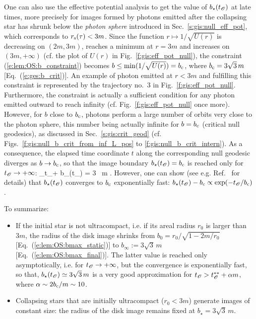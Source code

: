 One can also use the effective potential analysis to get the value of $b_\star(t_{\mathscr{O}})$
at late times, more precisely for images formed by photons emitted after the collapsing star has
shrunk below the \emph{photon sphere}
introduced in Sec.~\ref{s:gis:null_eff_pot}, which corresponds to
$r_{\rm s}(\tau) < 3m$. Since the function $r\mapsto 1/\sqrt{U(r)}$ is
decreasing on $(2m, 3m)$, reaches a minimum at $r=3m$ and increases on $(3m, +\infty)$
(cf. the plot of $U(r)$ in Fig.~\ref{f:gis:eff_pot_null}), the constraint
(\ref{e:lem:OS:b_constraint}) becomes $b \leq \min ({1}/{\sqrt{U(r)}}) = b_{\rm c}$,
where $b_{\rm c} = 3\sqrt{3} \, m$ [Eq.~(\ref{e:ges:b_crit})].
An example of photon emitted at $r<3m$ and fulfilling this constraint is
represented by the trajectory no.~3 in Fig.~\ref{f:gis:eff_pot_null}.
Furthermore, the constraint is actually a sufficient condition for any
photon emitted outward to reach infinity (cf. Fig.~\ref{f:gis:eff_pot_null} once more).
However, for $b$ close to $b_{\rm c}$, photons perform a large number of orbits
very close to the photon sphere, this number being actually infinite for $b=b_{\rm c}$
(critical null geodesics), as discussed in
Sec.~\ref{s:gis:crit_geod}
(cf. Figs.~\ref{f:gis:null_b_crit_from_inf_L_pos} to \ref{f:gis:null_b_crit_intern}).
As a consequence, the elapsed time coordinate $t$ along the corresponding null
geodesic diverges as $b \to b_{\rm c}$, so that
the image boundary $b_\star(t_{\mathscr{O}}) = b_{\rm c}$ is reached only for
$t_{\mathscr{O}} \to +\infty$:
\be \label{e:lem:OS:bmax_final}
    \lim_{t_\Obs \to +\infty} b_\star(t_\Obs) = 3 \, m .
\ee
However, one can show (see e.g. Ref.~\cite{YoshiTN19} for
details) that $b_\star(t_{\mathscr{O}})$ converges to $b_{\rm c}$ exponentially fast:
$b_\star(t_{\mathscr{O}}) - b_{\rm c} \propto \exp(- t_{\mathscr{O}}/b_{\rm c})$.


To summarize:

\begin{greybox}
\begin{itemize}
\item If the initial star is not ultracompact, i.e. if its areal radius
$r_0$ is larger than $3 m$,
the radius of the disk image shrinks from $b_0 = r_0 / \sqrt{1 - 2m/r_0}$
[Eq.~(\ref{e:lem:OS:bmax_static})]
to $b_\infty := 3\sqrt{3} \, m$ [Eq.~(\ref{e:lem:OS:bmax_final})].
The latter value is reached only asymptotically, i.e. for $t_{\mathscr{O}}\to +\infty$,
but the convergence is exponentially fast, so that, $b_\star(t_{\mathscr{O}}) \simeq 3\sqrt{3} \, m$
is a very good approximation for $t_{\mathscr{O}} > t_{\mathscr{O}}^{**} + \alpha m$, where $\alpha \sim 2 b_{\rm c}/m
\sim 10 $.
\item Collapsing stars that are initially ultracompact
($r_0 < 3 m$) generate images of constant size: the radius of the disk image
remains fixed at $b_\star = 3\sqrt{3} \, m$.
\end{itemize}
\end{greybox}

